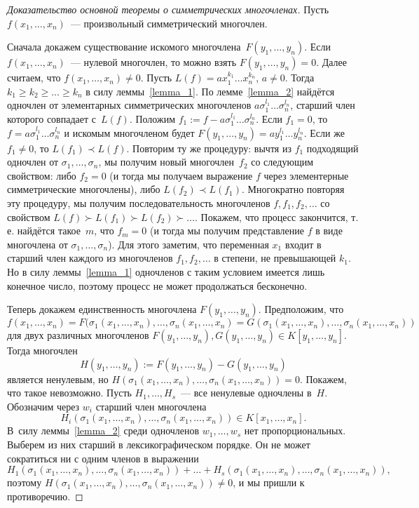 \documentclass[a4paper,10pt]{amsart}
\theoremstyle{definition}
\theoremstyle{remark}
\begin{document}
\begin{proof}[Доказательство основной теоремы о симметрических многочленах]
	Пусть $f(x_1, \ldots, x_n)$~--- произвольный симметрический
	многочлен.
	
	Сначала докажем существование искомого многочлена~$F(y_1, \ldots,
	y_n)$. Если $f(x_1, \ldots, x_n)$~--- нулевой многочлен, то можно
	взять $F(y_1,\ldots, y_n) = 0$. Далее считаем, что $f(x_1, \ldots,
	x_n) \ne 0$. Пусть $L(f) = ax_1^{k_1} \ldots x_n^{k_n}$, $a \ne 0$.
	Тогда $k_1 \geqslant k_2 \geqslant \ldots \geqslant k_n$ в силу
	леммы~\ref{lemma_1}. По лемме~\ref{lemma_2} найдётся одночлен от
	элементарных симметрических многочленов
	$a\sigma_1^{l_1}\ldots\sigma_n^{l_n}$, старший член которого
	совпадает с~$L(f)$. Положим $f_1 := f -
	a\sigma_1^{l_1}\ldots\sigma_n^{l_n}$. Если $f_1 = 0$, то $f = a
	\sigma_1^{l_1} \ldots \sigma_n^{l_n}$ и искомым многочленом будет
	$F(y_1, \ldots, y_n) = ay_1^{l_1} \ldots y_n^{l_n}$. Если же $f_1
	\ne 0$, то $L(f_1) \prec L(f)$. Повторим ту же процедуру: вычтя из
	$f_1$ подходящий одночлен от $\sigma_1, \ldots, \sigma_n$, мы
	получим новый многочлен~$f_2$ со следующим свойством: либо $f_2 = 0$
	(и тогда мы получаем выражение $f$ через элементерные симметрические
	многочлены), либо $L(f_2) \prec L(f_1)$. Многократно повторяя эту
	процедуру, мы получим последовательность многочленов $f, f_1, f_2,
	\ldots$ со свойством $L(f) \succ L(f_1) \succ L(f_2) \succ \ldots$.
	Покажем, что процесс закончится, т.\,е. найдётся такое~$m$, что $f_m
	= 0$ (и тогда мы получим представление $f$ в виде многочлена от
	$\sigma_1, \ldots, \sigma_n$). Для этого заметим, что переменная
	$x_1$ входит в старший член каждого из многочленов $f_1, f_2,
	\ldots$ в степени, не превышающей $k_1$. Но в силу
	леммы~\ref{lemma_1} одночленов с таким условием имеется лишь
	конечное число, поэтому процесс не может продолжаться бесконечно.
	
	Теперь докажем единственность многочлена $F(y_1, \ldots, y_n)$.
	Предположим, что
	$$
	f(x_1, \ldots, x_n) = F(\sigma_1(x_1, \ldots, x_n), \ldots,
	\sigma_n(x_1, \ldots, x_n) = G(\sigma_1(x_1, \ldots, x_n), \ldots,
	\sigma_n(x_1, \ldots, x_n))
	$$
	для двух различных многочленов $F(y_1, \ldots, y_n), G(y_1, \ldots,
	y_n) \in K[y_1, \ldots, y_n]$. Тогда многочлен $$H(y_1, \ldots, y_n)
	:= F(y_1, \ldots, y_n) - G(y_1, \ldots, y_n)$$ является ненулевым,
	но $H(\sigma_1(x_1, \ldots, x_n), \ldots, \sigma_n(x_1, \ldots,
	x_n)) = 0$. Покажем, что такое невозможно. Пусть $H_1, \ldots,
	H_s$~--- все ненулевые одночлены в~$H$. Обозначим через $w_i$
	старший член многочлена $$H_i(\sigma_1(x_1, \ldots, x_n), \ldots,
	\sigma_n(x_1, \ldots, x_n)) \in K[x_1, \ldots, x_n].$$ В~силу
	леммы~\ref{lemma_2} среди одночленов $w_1, \ldots, w_s$ нет
	пропорциональных. Выберем из них старший в лексикографическом
	порядке. Он не может сократиться ни с одним членов в выражении
	$$
	H_1(\sigma_1(x_1, \ldots, x_n), \ldots, \sigma_n(x_1, \ldots, x_n))
	+ \ldots + H_s(\sigma_1(x_1, \ldots, x_n), \ldots, \sigma_n(x_1,
	\ldots, x_n)),
	$$
	поэтому $H(\sigma_1(x_1, \ldots, x_n), \ldots, \sigma_n(x_1, \ldots,
	x_n)) \ne 0$, и мы пришли к противоречию.
\end{proof}
\end{document}
